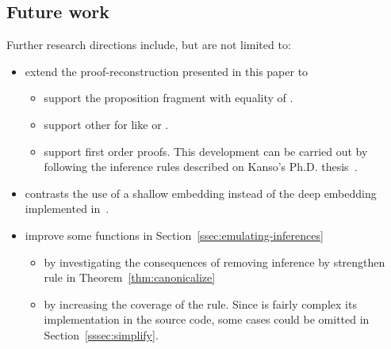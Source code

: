 \documentclass[../main.tex]{subfiles}
\begin{document}
\subsection*{Future work}

Further research  directions include, but are not limited to:

\begin{itemize}
\item extend the proof-reconstruction presented in this paper to
  \begin{itemize}
    \item support the proposition fragment with equality of \Metis.
    \item support other \ATPs for \CPL like  or .
    \item support \Metis first order proofs.
This development can be carried out by following the 
inference rules described on Kanso's Ph.D. thesis~\cite{Kanso2012}.
  \end{itemize}
\item contrasts the use of a shallow embedding instead
of the deep embedding implemented in~\cite{AgdaProp}.
\item improve some functions in Section~\ref{ssec:emulating-inferences}
\begin{itemize}
  \item by investigating the consequences of removing \clausify
inference by strengthen \canonicalize rule in Theorem~\ref{thm:canonicalize}
  \item by increasing the coverage of the \simplify rule. Since is fairly
complex its implementation in the \Metis source code, some cases could be omitted in Section~\ref{sssec:simplify}.
\end{itemize}


\end{itemize}
\end{document}
